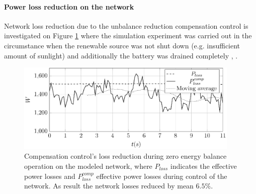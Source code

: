         \paragraph{Power loss reduction on the network}

             Network loss reduction due to the unbalance reduction compensation control is investigated on Figure \ref{fig:compare_power} where the simulation experiment was carried out in the circumstance when the renewable source was not shut down (e.g. insufficient amount of sunlight) and additionally the battery was drained completely  \cite{Neukirchner2015}, \cite{neukirchner2015examination}.
            \begin{figure}[ht]
            \centering
            \includegraphics[width=0.95\textwidth]{Unblance_EPS_Pics/UnbalRedComp_JCP-figure6.eps}
            \caption{Compensation control's loss reduction during zero energy balance operation on the modeled network, where $P_{loss}$ indicates the effective power losses and $P^{comp}_{loss}$ effective power losses during control of the network. As result the network losses reduced by mean $6.5\%$.}
            \label{fig:compare_power}
            \end{figure}
